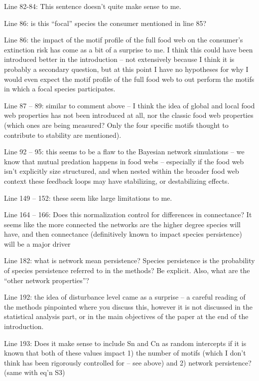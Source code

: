 \documentclass[12pt]{article}
\begin{document}
Line 82-84: This sentence doesn’t quite make sense to me.

Line 86: is this “focal” species the consumer mentioned in line 85?

Line 86: the impact of the motif profile of the full food web on the consumer’s extinction risk has come as a bit of a surprise to me. I think this could have been introduced better in the introduction – not extensively because I think it is probably a secondary question, but at this point I have no hypotheses for why I would even expect the motif profile of the full food web to out perform the motifs in which a focal species participates.

Line 87 – 89: similar to comment above – I think the idea of global and local food web properties has not been introduced at all, nor the classic food web properties (which ones are being measured? Only the four specific motifs thought to contribute to stability are mentioned).

Line 92 – 95: this seems to be a flaw to the Bayesian network simulations – we know that mutual predation happens in food webs – especially if the food web isn’t explicitly size structured, and when nested within the broader food web context these feedback loops may have stabilizing, or destabilizing effects.

Line 149 – 152: these seem like large limitations to me.

Line 164 – 166: Does this normalization control for differences in connectance? It seems like the more connected the networks are the higher degree species will have, and then connectance (definitively known to impact species persistence) will be a major driver

Line 182: what is network mean persistence? Species persistence is the probability of species persistence referred to in the methods? Be explicit. Also, what are the “other network properties”?

Line 192: the idea of disturbance level came as a surprise – a careful reading of the methods pinpointed where you discuss this, however it is not discussed in the statistical analysis part, or in the main objectives of the paper at the end of the introduction.

Line 193: Does it make sense to include Sn and Cn as random intercepts if it is known that both of these values impact 1) the number of motifs (which I don’t think has been rigorously controlled for – see above) and 2) network persistence? (same with eq’n S3)
\end{document}
